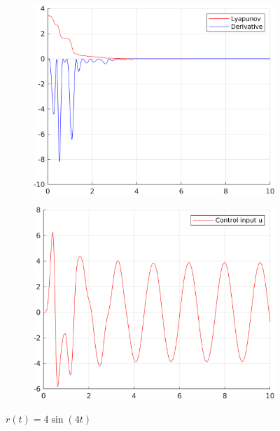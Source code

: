 \documentclass[12pt,a4paper]{article}
\begin{document}
\begin{figure}[H]
\begin{subfigure}{.45\textwidth}
				\includegraphics[width=1\textwidth]{Graphics/LinearLyapunov2.png}
			\end{subfigure}%
			\begin{subfigure}{.45\textwidth}
				\centering
				\includegraphics[width=1\textwidth]{Graphics/LinearControl2.png}
			\end{subfigure}
		    \caption{$r(t) = 4\sin(4t)$}
		\end{figure}
	
\end{document}
